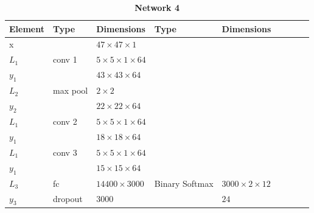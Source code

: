 \begin{table}[h!]
\centering
\caption*{{\bf \large Network 4}}
{\footnotesize
\begin{tabular}{|lllllllll|}
\hline
\multicolumn{1}{|l|}{Element} & Type     & \multicolumn{1}{l|}{Dimensions}                     & Type     & \multicolumn{1}{l|}{Dimensions}  \\ \hline
\multicolumn{1}{|l|}{x}       &          & \multicolumn{1}{l|}{$47\times47\times1$}            &          & \multicolumn{1}{l|}{}        \\ \hline

\multicolumn{1}{|l|}{$L_1$}   & conv 1   & \multicolumn{1}{l|}{$5\times 5\times1\times 64$}    &          & \multicolumn{1}{l|}{}\\
\multicolumn{1}{|l|}{$y_1$}   &          & \multicolumn{1}{l|}{$43\times43\times64$}           &          & \multicolumn{1}{l|}{}        \\ \hline

\multicolumn{1}{|l|}{$L_2$}   & max pool & \multicolumn{1}{l|}{$2\times 2$}                    &          & \multicolumn{1}{l|}{}        \\
\multicolumn{1}{|l|}{$y_2$}   &          & \multicolumn{1}{l|}{$22\times22\times 64$}          &          & \multicolumn{1}{l|}{}        \\ \hline

\multicolumn{1}{|l|}{$L_1$}   & conv 2   & \multicolumn{1}{l|}{$5\times 5\times1\times 64$}    &          & \multicolumn{1}{l|}{}\\
\multicolumn{1}{|l|}{$y_1$}   &          & \multicolumn{1}{l|}{$18\times18\times64$}           &          & \multicolumn{1}{l|}{}        \\ \hline

\multicolumn{1}{|l|}{$L_1$}   & conv 3   & \multicolumn{1}{l|}{$5\times 5\times1\times 64$}    &          & \multicolumn{1}{l|}{}\\
\multicolumn{1}{|l|}{$y_1$}   &          & \multicolumn{1}{l|}{$15\times15\times64$}           &          & \multicolumn{1}{l|}{}        \\ \hline

\multicolumn{1}{|l|}{$L_3$}   & fc       & \multicolumn{1}{l|}{$14400\times3000$}              & Binary Softmax & \multicolumn{1}{l|}{$3000\times2\times12$}        \\
\multicolumn{1}{|l|}{$y_3$}   & dropout  & \multicolumn{1}{l|}{$3000$}                         &          & \multicolumn{1}{l|}{$24$}        \\ \hline


\end{tabular}}
\end{table}
